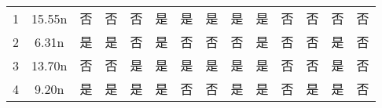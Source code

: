 \documentclass[withoutpreface,bwprint]{cumcmthesis} %
\begin{document}
\begin{table}[htbp]
{\begin{tabular}{c|c|cccc|cccc|cccc}
		1                   & 15.55n                & 否                                                 & 否                                                 & 否                                               & 是                                                 & 是                                                 & 是                                                 & 是                                               & 是                                                 & 否                                                 & 否                                                 & 否                                               & 否                                                 \\
		2                   & 6.31n                 & 是                                                 & 是                                                 & 否                                               & 是                                                 & 否                                                 & 否                                                 & 否                                               & 是                                                 & 否                                                 & 否                                                 & 是                                               & 否                                                 \\
		3                   & 13.70n                & 否                                                 & 否                                                 & 是                                               & 是                                                 & 是                                                 & 是                                                 & 是                                               & 是                                                 & 否                                                 & 否                                                 & 是                                               & 否                                                 \\
		4                   & 9.20n               & 是                                                 & 是                                                 & 是                                               & 是                                                 & 否                                                 & 否                                                 & 是                                               & 是                                                 & 否                                                 & 是                                                 & 是                                               & 否                                                 \\

\end{tabular}}
\end{table}
\end{document}

